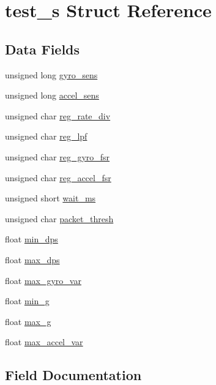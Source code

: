 \hypertarget{structtest__s}{}\section{test\+\_\+s Struct Reference}
\label{structtest__s}
\subsection*{Data Fields}
\begin{DoxyCompactItemize}
\item 
unsigned long \hyperlink{structtest__s_a32da1174cf6569aa99bdff70055bb45a}{gyro\+\_\+sens}
\item 
unsigned long \hyperlink{structtest__s_a22a1d8ebbceb431baa0dfdc911fbc8ab}{accel\+\_\+sens}
\item 
unsigned char \hyperlink{structtest__s_a82f9074fa4cc93f3d21f826a9e739294}{reg\+\_\+rate\+\_\+div}
\item 
unsigned char \hyperlink{structtest__s_a794ee75f43ca70e89a68b43642eb2c59}{reg\+\_\+lpf}
\item 
unsigned char \hyperlink{structtest__s_a6063bc7c719cdaddf88633b1148fd323}{reg\+\_\+gyro\+\_\+fsr}
\item 
unsigned char \hyperlink{structtest__s_a08dc2a906129744a045950c3642a9023}{reg\+\_\+accel\+\_\+fsr}
\item 
unsigned short \hyperlink{structtest__s_a0abed830f8dc38c7bd17ce78ee2530d8}{wait\+\_\+ms}
\item 
unsigned char \hyperlink{structtest__s_aa8dbf099c1734ea67c1ef1938c0baec8}{packet\+\_\+thresh}
\item 
float \hyperlink{structtest__s_a73ee82e1de6d3bdc4cc37282c012f0e1}{min\+\_\+dps}
\item 
float \hyperlink{structtest__s_a9085b0647fbd57e7ed8e0c4371ad1de2}{max\+\_\+dps}
\item 
float \hyperlink{structtest__s_a629a75454f5af8caaff2fe8388975d32}{max\+\_\+gyro\+\_\+var}
\item 
float \hyperlink{structtest__s_aa295cc026745ef7378eeff0c72638ed0}{min\+\_\+g}
\item 
float \hyperlink{structtest__s_a30dbaf47c9d41bf9e86370664d661bd0}{max\+\_\+g}
\item 
float \hyperlink{structtest__s_ad5bc54ab7d1b1a0f158ca1a79359c3bc}{max\+\_\+accel\+\_\+var}
\end{DoxyCompactItemize}


\subsection{Field Documentation}
